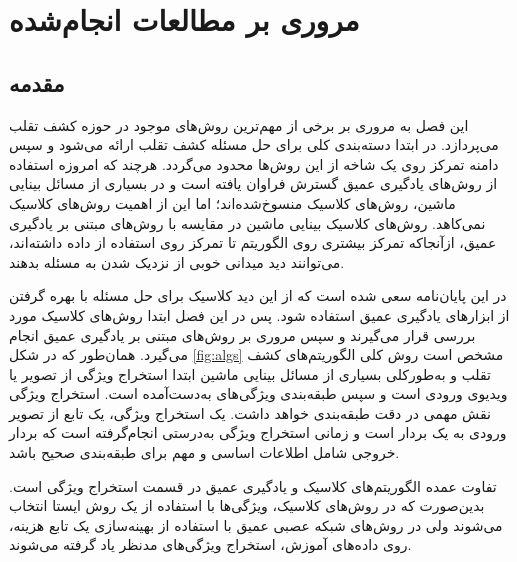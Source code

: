 
\chapter{مروری بر مطالعات انجام‌شده}
\section{مقدمه}
این فصل به مروری بر برخی از مهم‌ترین روش‌های موجود در حوزه کشف تقلب می‌پردازد. در ابتدا دسته‌بندی کلی برای حل مسئله کشف تقلب ارائه می‌شود و سپس دامنه تمرکز روی یک شاخه از این روش‌ها محدود می‌گردد. هرچند که امروزه استفاده از روش‌های یادگیری عمیق گسترش فراوان یافته است و در بسیاری از مسائل بینایی ماشین، روش‌های کلاسیک منسوخ‌شده‌اند؛ اما این از اهمیت روش‌های کلاسیک نمی‌کاهد.
روش‌های کلاسیک بینایی ماشین در مقایسه با روش‌های مبتنی بر یادگیری عمیق، ازآنجا‌که تمرکز بیشتری روی الگوریتم تا تمرکز روی استفاده از داده داشته‌اند، می‌توانند دید میدانی خوبی از نزدیک شدن به مسئله بدهند.


در این پایان‌نامه سعی شده است که از این دید کلاسیک برای حل مسئله با بهره گرفتن از ابزارهای یادگیری عمیق استفاده شود. پس در این فصل ابتدا روش‌های کلاسیک مورد بررسی قرار می‌گیرند و سپس مروری بر روش‌های مبتنی بر یادگیری عمیق انجام می‌گیرد. 
همان‌طور که در شکل 
\ref{fig:algs}
مشخص است روش کلی الگوریتم‌های کشف تقلب و به‌طور‌کلی بسیاری از مسائل بینایی ماشین ابتدا استخراج ویژگی از تصویر یا ویدیوی ورودی است و سپس طبقه‌بندی ویژگی‌های به‌دست‌آمده است. استخراج ویژگی نقش مهمی در دقت طبقه‌بندی خواهد داشت. یک استخراج ویژگی، یک تابع از تصویر ورودی به یک بردار است و زمانی استخراج ویژگی به‌درستی انجام‌گرفته است که بردار خروجی شامل اطلاعات اساسی و مهم برای طبقه‌بندی صحیح باشد.

تفاوت عمده الگوریتم‌های کلاسیک و یادگیری عمیق در قسمت استخراج ویژگی است. بدین‌صورت که در روش‌های کلاسیک، ویژگی‌ها با استفاده از یک روش ایستا انتخاب می‌شوند ولی در روش‌های شبکه عصبی عمیق با استفاده از بهینه‌سازی یک تابع هزینه، روی داده‌های آموزش، استخراج ویژگی‌های مد‌نظر یاد گرفته می‌شوند.



